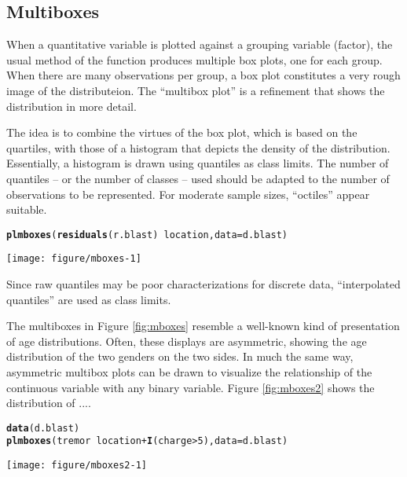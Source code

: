 \documentclass[11pt]{article}\usepackage[]{graphicx}\usepackage[]{color}
\makeatletter
\def\maxwidth{ %
  \ifdim\Gin@nat@width>\linewidth
    \linewidth
  \else
    \Gin@nat@width
  \fi
}
\newcommand{\hlnum}[1]{\textcolor[rgb]{0.686,0.059,0.569}{#1}}%
\newcommand{\hlopt}[1]{\textcolor[rgb]{0,0,0}{#1}}%
\newcommand{\hlstd}[1]{\textcolor[rgb]{0.345,0.345,0.345}{#1}}%
\newcommand{\hlkwc}[1]{\textcolor[rgb]{0.333,0.667,0.333}{#1}}%
\newcommand{\hlkwd}[1]{\textcolor[rgb]{0.737,0.353,0.396}{\textbf{#1}}}%
\newenvironment{kframe}{%
 \def\at@end@of@kframe{}%
 \ifinner\ifhmode%
  \def\at@end@of@kframe{\end{minipage}}%
  \begin{minipage}{\columnwidth}%
 \fi\fi%
 \def\FrameCommand##1{\hskip\@totalleftmargin \hskip-\fboxsep
 \colorbox{shadecolor}{##1}\hskip-\fboxsep
     \hskip-\linewidth \hskip-\@totalleftmargin \hskip\columnwidth}%
 \MakeFramed {\advance\hsize-\width
   \@totalleftmargin\z@ \linewidth\hsize
   \@setminipage}}%
 {\par\unskip\endMakeFramed%
 \at@end@of@kframe}
\newenvironment{knitrout}{}{} %
\makeatother
\begin{document}
\subsection{Multiboxes}

When a quantitative variable is plotted against a grouping variable
(factor), the usual  method of the  function produces
multiple box plots, one for each group. When there are many observations
per group, a box plot constitutes a very rough image of the distributeion.
The ``multibox plot'' is a refinement that shows the distribution in more
detail. 

The idea is to combine the virtues of the box plot, which is based on the
quartiles, with those of a histogram that depicts the density of the
distribution. 
Essentially, a histogram is drawn using quantiles as class limits.
The number of quantiles -- or the number of classes -- used should be
adapted to the number of observations to be represented.
For moderate sample sizes, ``octiles'' appear suitable.

\Bfig
\begin{knitrout}
\color{fgcolor}\begin{kframe}
\begin{alltt}
\hlkwd{plmboxes}\hlstd{(}\hlkwd{residuals}\hlstd{(r.blast)}\hlopt{~}\hlstd{location,} \hlkwc{data}\hlstd{=d.blast)}
\end{alltt}
\end{kframe}
\texttt{[image: figure/mboxes-1]} 

\end{knitrout}
Since raw quantiles may be poor characterizations for discrete data,
``interpolated quantiles'' are used as class limits.

The multiboxes in Figure \ref{fig:mboxes} resemble a well-known kind of
presentation of age distributions. Often, these displays are asymmetric,
showing the age distribution of the two genders on the two sides.
In much the same way, asymmetric multibox plots can be drawn to visualize
the relationship of the continuous variable with any binary variable.
Figure \ref{fig:mboxes2} shows the distribution of ....

\Bfig
\begin{knitrout}
\color{fgcolor}\begin{kframe}
\begin{alltt}
\hlkwd{data}\hlstd{(d.blast)}
\hlkwd{plmboxes}\hlstd{(tremor}\hlopt{~}\hlstd{location}\hlopt{+}\hlkwd{I}\hlstd{(charge}\hlopt{>}\hlnum{5}\hlstd{),} \hlkwc{data}\hlstd{=d.blast)}
\end{alltt}
\end{kframe}
\texttt{[image: figure/mboxes2-1]} 

\end{knitrout}
\end{document}
